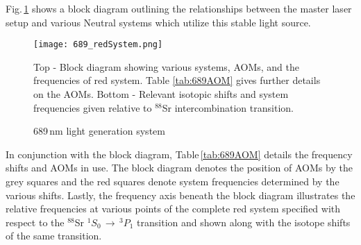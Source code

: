 Fig.\,\ref{fig:689blockSys} shows a block diagram outlining the relationships between the master laser setup and various Neutral systems which utilize this stable light source.
	\begin{figure}
		\centerline{
		\texttt{[image: 689\_redSystem.png]}}
		\caption{689\,nm light generation system}{Top - Block diagram showing various systems, AOMs, and the frequencies of red system. Table \ref{tab:689AOM} gives further details on the AOMs. Bottom - Relevant isotopic shifts and system frequencies given relative to $^{88}$Sr intercombination transition.}
		\label{fig:689blockSys}
	\end{figure} 
In conjunction with the block diagram, Table\,\ref{tab:689AOM} details the frequency shifts and AOMs in use. 
The block diagram denotes the position of AOMs by the grey squares and the red squares denote system frequencies determined by the various shifts.
Lastly, the frequency axis beneath the block diagram illustrates the relative frequencies at various points of the complete red system specified with respect to the $^{88}$Sr $^1S_0\,\rightarrow\,^3P_1$ transition and shown along with the isotope shifts of the same transition.
